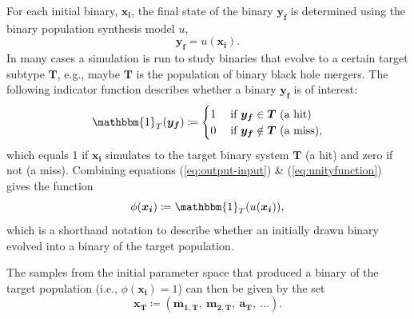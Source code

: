 \documentclass[a4paper,fleqn,usenatbib,useAMS,usedcolumn]{mnras}
\begin{document}
For each initial binary, $\boldsymbol{x_i}$, the final state of the binary  $\boldsymbol{y_f}$ is determined using the binary population synthesis model $u$,  
%
\begin{equation}
	\boldsymbol{y_f} = u(\boldsymbol{x_i}). 
	\label{eq:output-input} 
\end{equation}  
%
In many cases a simulation is run to study binaries  that evolve to a certain target subtype $\boldsymbol{T}$, e.g., maybe $\boldsymbol{T}$ is the population of binary black hole mergers.  The following indicator function describes whether a binary $\boldsymbol{y_f}$ is of interest:
%
\begin{equation}
\begin{aligned}
	\mathbbm{1}_{T}(\boldsymbol{y_f} ) \coloneqq \begin{cases} 1 \hspace{0.1cm} &\text{if } \boldsymbol{y_f} \in \boldsymbol{T}  \text{ (a hit) }  \\
	0  &\text{if } \boldsymbol{y_f} \notin \boldsymbol{T} \text{ (a miss)},  
	\end{cases}
	\label{eq:unityfunction}
\end{aligned}
\end{equation}
%
which equals 1 if $\boldsymbol{x_i}$ simulates to the target binary system
$\boldsymbol{T}$ (a hit) and zero if not (a miss).  Combining equations (\ref{eq:output-input}) \& (\ref{eq:unityfunction}) gives the function
%
%
\begin{equation}
\phi(\boldsymbol{x_i}) \coloneqq \mathbbm{1}_{T}(u(\boldsymbol{x_i}) ),
\end{equation} 
which is a shorthand notation to describe whether an initially drawn binary evolved into a binary of the target population.  

The samples from the initial parameter space that produced a binary of the target population (i.e.,  $\phi(\boldsymbol{x_i}  )= 1 $)  can then be given by the set
%
\begin{equation}
	\boldsymbol{x_{\text{T}}} \coloneqq ( \boldsymbol{m_{1,{\textbf{T}}}, \ m_{2,{\textbf{T}}}, \ {a_{\textbf{T}}}, \ \ldots }).
\end{equation}
%
\end{document}
